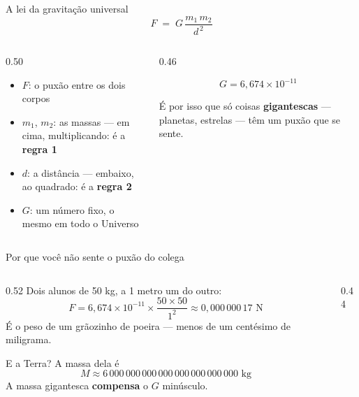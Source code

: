 \documentclass[aspectratio=169,11pt]{beamer}
\newcommand{\bnum}[1]{\textbf{\textcolor{mTeal}{#1}}}
\begin{document}
\begin{frame}{A lei da gravitação universal}
  \[ \boxed{\; F \;=\; G\,\frac{m_1\, m_2}{d^{\,2}} \;} \]
  \medskip
  \begin{columns}[T]
    \begin{column}{0.50\textwidth}
      \begin{itemize}
        \item $F$: o puxão entre os dois corpos
        \item $m_1$, $m_2$: as massas --- em cima, multiplicando: é a \bnum{regra 1}
        \item $d$: a distância --- embaixo, ao quadrado: é a \bnum{regra 2}
        \item $G$: um número fixo, o mesmo em todo o Universo
      \end{itemize}
    \end{column}
    \begin{column}{0.46\textwidth}
      \begin{ideia}[title={G é minúsculo}]
        \[ G = 6{,}674 \times 10^{-11} \]

        É por isso que só coisas \bnum{gigantescas} --- planetas, estrelas --- têm um puxão
        que se sente.
      \end{ideia}
    \end{column}
  \end{columns}
\end{frame}

\begin{frame}{Por que você não sente o puxão do colega}
  \begin{columns}[T]
    \begin{column}{0.52\textwidth}
      Dois alunos de 50 kg, a 1 metro um do outro:
      \[ F = 6{,}674 \times 10^{-11} \times \frac{50 \times 50}{1^2}
           \approx 0{,}000\,000\,17 \text{ N} \]
      É o peso de um \alert{grãozinho de poeira} --- menos de um centésimo de miligrama.
      \medskip

      E a Terra? A massa dela é
      \[ M \approx 6\,000\,000\,000\,000\,000\,000\,000\,000 \text{ kg} \]
      A massa gigantesca \bnum{compensa} o $G$ minúsculo.
    \end{column}
    \begin{column}{0.44\textwidth}
      \centering
    \end{column}
  \end{columns}
\end{frame}
\end{document}
